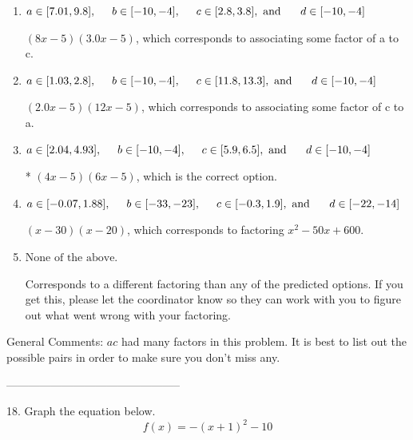 \documentclass{article}[14pt]
\begin{document}
\begin{enumerate}[label=\Alph*.] 
\item $ a \in [7.01, 9.8], \hspace*{5mm} b \in [-10, -4], \hspace*{5mm} c \in [2.8, 3.8], \text{ and } \hspace*{5mm} d \in [-10, -4] $ 

  $(8x -5)(3.0x -5)$, which corresponds to associating some factor of a to c. 
\item $ a \in [1.03, 2.8], \hspace*{5mm} b \in [-10, -4], \hspace*{5mm} c \in [11.8, 13.3], \text{ and } \hspace*{5mm} d \in [-10, -4] $ 

  $(2.0x -5)(12x -5)$, which corresponds to associating some factor of c to a. 
\item $ a \in [2.04, 4.93], \hspace*{5mm} b \in [-10, -4], \hspace*{5mm} c \in [5.9, 6.5], \text{ and } \hspace*{5mm} d \in [-10, -4] $ 

 * $(4x -5)(6x -5)$, which is the correct option. 
\item $ a \in [-0.07, 1.88], \hspace*{5mm} b \in [-33, -23], \hspace*{5mm} c \in [-0.3, 1.9], \text{ and } \hspace*{5mm} d \in [-22, -14] $ 

  $(x -30)(x -20)$, which corresponds to factoring $x^{2} -50 x + 600$. 
\item $ \text{None of the above.} $ 

  Corresponds to a different factoring than any of the predicted options. If you get this, please let the coordinator know so they can work with you to figure out what went wrong with your factoring. 
\end{enumerate} 
 
General Comments: $ac$ had many factors in this problem. It is best to list out the possible pairs in order to make sure you don't miss any.

-----------------------------------------------

18. Graph the equation below.
$$ f(x) = -(x+1)^2 - 10 $$ 
\end{document}
